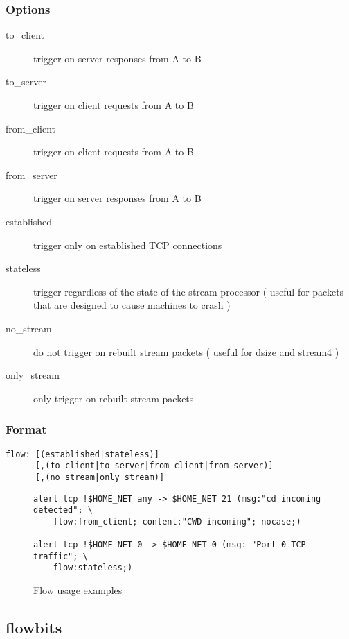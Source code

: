 \documentclass[english]{report}
\begin{document}
\subsubsection*{Options}

\begin{description}
\item [to\_client]trigger on server responses from A to B
\item [to\_server]trigger on client requests from A to B
\item [from\_client]trigger on client requests from A to B
\item [from\_server]trigger on server responses from A to B
\item [established]trigger only on established TCP connections
\item [stateless]trigger regardless of the state of the stream processor
( useful for packets that are designed to cause machines to crash
)
\item [no\_stream]do not trigger on rebuilt stream
packets ( useful for dsize and stream4 )
\item [only\_stream]only trigger on rebuilt stream
packets
\end{description}

\subsubsection{Format}

\begin{verbatim}
flow: [(established|stateless)] 
      [,(to_client|to_server|from_client|from_server)]
      [,(no_stream|only_stream)]
\end{verbatim}

\begin{figure}[!hbpt]
\begin{verbatim}
alert tcp !$HOME_NET any -> $HOME_NET 21 (msg:"cd incoming detected"; \
    flow:from_client; content:"CWD incoming"; nocase;)

alert tcp !$HOME_NET 0 -> $HOME_NET 0 (msg: "Port 0 TCP traffic"; \
    flow:stateless;)
\end{verbatim}

\caption{Flow usage examples\label{flow usage examples}}
\end{figure}

\subsection{flowbits\label{flowbits}}
\end{document}
